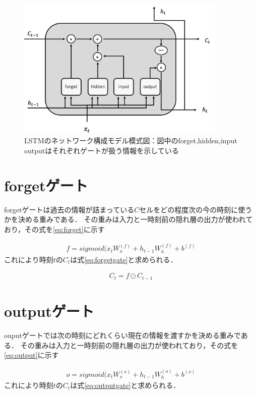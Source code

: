 \documentclass[a4j,11pt,report]{jsbook}
\begin{document}
\begin{figure}
  \centering
  \includegraphics[width = 100mm]{image/lstm_simple_image.png}
  \caption{LSTMのネットワーク構成モデル模式図：図中のforget,hidden,input outputはそれぞれゲートが扱う情報を示している }
  \label{fig:LSTM_Simple}
\end{figure}

\section{forgetゲート\label{sec:forget}}
forgetゲートは過去の情報が詰まっている$C$セルをどの程度次の今の時刻に使うかを決める重みである．
その重みは入力と一時刻前の隠れ層の出力が使われており，その式を\ref{eq:forget}に示す

\begin{equation}
  \label{eq:forget}
  \begin{split}
    f = sigmoid(x_{t}W_{x}^{(f)} + h_{t-1}W_{h}^{(f)} + b^{(f)}
  \end{split}
\end{equation}
これにより時刻$t$の$C_{t}$は式\ref{eq:forgetgate}と求められる．

\begin{equation}
  \label{eq:forgetgate}
  \begin{split}
    C_{t} = f \odot C_{t-1}
  \end{split}
\end{equation}


\section{outputゲート\label{sec:output}}
ouputゲートでは次の時刻にどれくらい現在の情報を渡すかを決める重みである．
その重みは入力と一時刻前の隠れ層の出力が使われており，その式を\ref{eq:output}に示す


\begin{equation}
  \label{eq:output}
  \begin{split}
    o = sigmoid(x_{t}W_{x}^{(o)} + h_{t-1}W_{h}^{(o)} + b^{(o)}
  \end{split}
\end{equation}
これにより時刻$t$の$C_{t}$は式\ref{eq:outputgate}と求められる．
\end{document}
